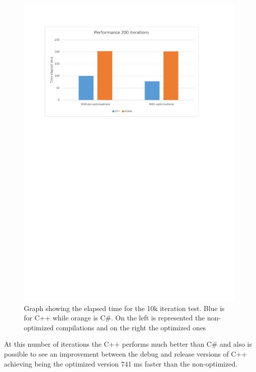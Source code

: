 \begin{figure}[H]\begin{center}
 \centering
  \captionsetup{justification=centering}
  \includegraphics[scale=0.9,page=2]{pictures/performance-tests/GPIO/graphs}
  \caption{Graph showing the elapsed time for the 10k iteration test. Blue is for C++ while orange is C\#. On the left is represented the non-optimized compilations and on the right the optimized ones\label{fig:gpio-graph-10k}}
\end{center}\end{figure}
At this number of iterations the C++ performs much better than C\# and also is possible to see an improvement between the debug and release versions of C++ achieving being the optimized version 741 ms faster than the non-optimized.


